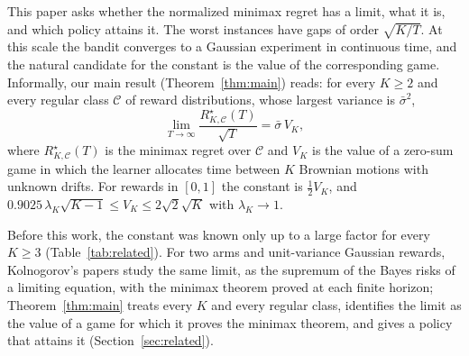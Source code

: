 \documentclass[11pt]{article}
\newcommand{\1}{\mathbf{1}}
\begin{document}
This paper asks whether the normalized minimax regret has a limit, what it is, and which policy attains it. The worst instances have gaps of
order $\sqrt{K/T}$. At this scale the bandit converges to a Gaussian experiment in continuous time, and the natural candidate for the constant is
the value of the corresponding game. Informally, our main result (Theorem~\ref{thm:main}) reads: for every $K\ge2$ and every regular class
$\mathcal C$ of reward distributions, whose largest variance is $\bar\sigma^2$,
\begin{equation*}
\lim_{T\to\infty}\frac{R^\star_{K,\mathcal C}(T)}{\sqrt T}=\bar\sigma\,V_K ,
\end{equation*}
where $R^\star_{K,\mathcal C}(T)$ is the minimax regret over $\mathcal C$ and $V_K$ is the value of a zero-sum game in which the learner allocates
time between $K$ Brownian motions with unknown drifts. For rewards in $[0,1]$ the constant is $\frac12V_K$, and
$0.9025\,\lambda_K\sqrt{K-1}\le V_K\le2\sqrt2\sqrt K$ with $\lambda_K\to1$.

Before this work, the constant was known only up to a large factor for every $K\ge3$ (Table~\ref{tab:related}). For two arms and unit-variance Gaussian
rewards, Kolnogorov's papers study the same limit, as the supremum of the Bayes risks of a limiting equation, with the minimax theorem proved at each
finite horizon; Theorem~\ref{thm:main} treats every $K$ and every regular class, identifies the limit as the value of a game for which it proves the
minimax theorem, and gives a policy that attains it (Section~\ref{sec:related}).
\end{document}

